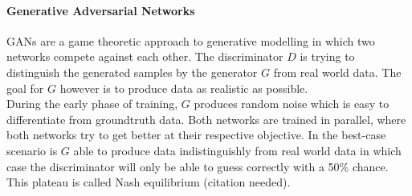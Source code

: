 \paragraph{Generative Adversarial Networks\cite{gan:2014}}
\label{par:overview_gan}
GANs are a game theoretic approach to generative modelling
in which two networks compete against each other.
The discriminator $D$ is trying to distinguish the generated samples
by the generator $G$ from real world data.
The goal for $G$ however is to produce data as realistic as possible.\\
During the early phase of training, $G$ produces random noise which
is easy to differentiate from groundtruth data.
Both networks are trained in parallel, where both networks try to get better
at their respective objective.
In the best-case scenario is $G$ able to produce data indistinguishly from real world data in which
case the discriminator will only be able to guess correctly with a 50\% chance.
This plateau is called Nash equilibrium (citation needed).




